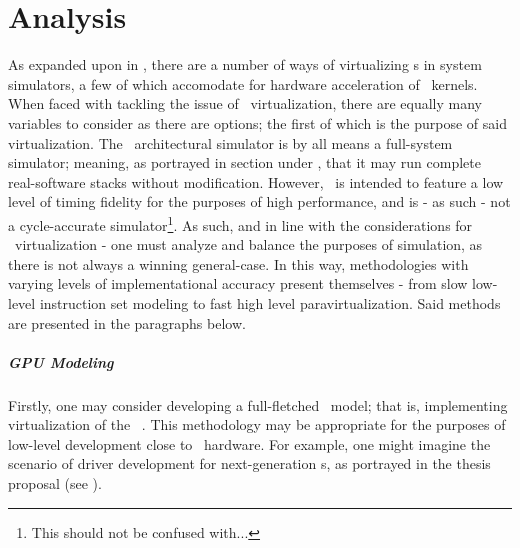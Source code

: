 

\chapter{Analysis}
\label{cha:analysis}
As expanded upon in , there are a number of ways of virtualizing \dvttermgpu s in system simulators, a few of which accomodate for hardware acceleration of \dvttermgpu\ kernels.
When faced with tackling the issue of \dvttermgpu\ virtualization, there are equally many variables to consider as there are options; the first of which is the purpose of said virtualization.
The \dvttermsimics\ architectural simulator is by all means a full-system simulator; meaning, as portrayed in section  under , that it may run complete real-software stacks without modification.
However, \dvttermsimics\ is intended to feature a low level of timing fidelity for the purposes of high performance, and is - as such - not a cycle-accurate simulator\footnote{This should not be confused with...}.
As such, and in line with the considerations for \dvttermgpu\ virtualization - one must analyze and balance the purposes of simulation, as there is not always a winning general-case.
In this way, methodologies with varying levels of implementational accuracy present themselves - from slow low-level instruction set modeling to fast high level paravirtualization.
Said methods are presented in the paragraphs below.

\paragraph{GPU Modeling}
\label{par:analysis_gpumodeling}
Firstly, one may consider developing a full-fletched \dvttermgpu\ model; that is, implementing virtualization of the \dvttermgpu\ \dvttermisa .
This methodology may be appropriate for the purposes of low-level development close to \dvttermgpu\ hardware.
For example, one might imagine the scenario of driver development for next-generation \dvttermgpu s, as portrayed in the thesis proposal (see ).


